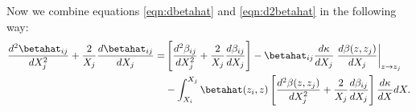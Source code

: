 Now we combine equations \ref{eqn:dbetahat} and \ref{eqn:d2betahat} in the following way:
\begin{eqnarray}
\frac{d^2 \betahat_{i j}}{d X_j^2} + \frac{2}{X_j} \frac{d \betahat_{i j}}{d X_j} = & \left[\frac{d^2 \beta_{i j}}{d X_j^2}  + \frac{2}{X_j} \frac{d \beta_{i j}}{d X_j}\right] -  \betahat_{i j} \frac{d \kappa}{d X_j} \left. \frac{d \beta(z, z_j)}{d X_j}  \right|_{z \rightarrow z_j} \nonumber \\ 
&- \int_{X_i}^{X_j} \betahat(z_i, z)\left[ \frac{d^2 \beta(z, z_j)}{d X_j^2}  + \frac{2}{X_j} \frac{d \beta_{i j}}{dX_j}\right] \frac{d \kappa}{d X} d X.\label{eqn:betahatcombine}
\end{eqnarray}
  
  
  
  